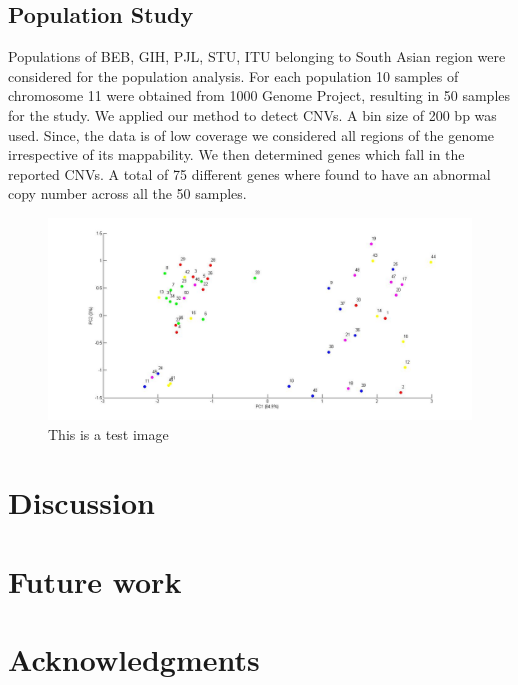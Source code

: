 \documentclass[twocolumn,oneside,conference]
{IEEEtran}
\begin{document}
\subsection{Population Study}
Populations of BEB, GIH, PJL, STU, ITU belonging to South Asian region were considered for the population analysis. For each population 10 samples of chromosome 11 were obtained from 1000 Genome Project, resulting in 50 samples for the study. We applied our method to detect CNVs. A bin size of 200 bp was used. Since, the data is of low coverage we considered all regions of the genome irrespective of its mappability. We then determined genes which fall in the reported CNVs. A total of 75  different genes where found to have an abnormal copy number across all the 50 samples.        

\begin{figure}[h]
	\includegraphics[width=\textwidth]{final.jpg}
	\caption{This is a test image}
	\label{fig1: this is test image}
\end{figure}

\section{Discussion}

\section{Future work}

\section*{Acknowledgments}


\printbibliography
\end{document}
